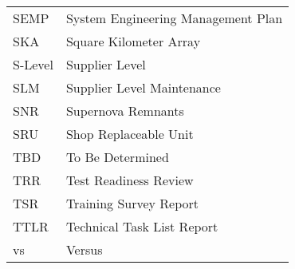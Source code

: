 \begin{longtable}{@{}ll@{}}
		SEMP	&	System Engineering Management Plan	\\
		SKA	&	Square Kilometer Array	\\
		S-Level	&	Supplier Level	\\
		SLM	&	Supplier Level Maintenance	\\
		SNR	&	Supernova Remnants	\\
		SRU	&	Shop Replaceable Unit	\\
		TBD	&	To Be Determined	\\
		TRR	&	Test Readiness Review	\\
		TSR	&	Training Survey Report	\\
		TTLR	&	Technical Task List Report	\\
		vs	&	Versus	\\	
	\end{longtable}

